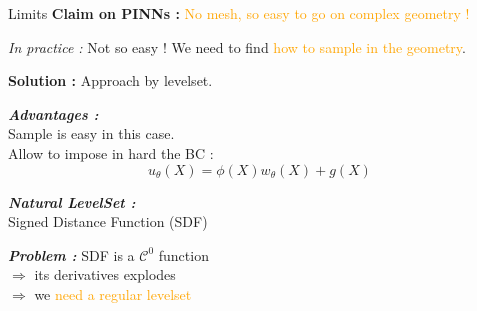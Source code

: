 \begin{frame}{Limits}
	\textbf{Claim on PINNs :} \textcolor{orange}{No mesh, so easy to go on complex geometry !}
	
	{\selectfont{}\relax} \textit{In practice :} Not so easy ! We need to find \textcolor{orange}{how to sample in the geometry}.
	
	\vspace{8pt}
	
	\textbf{Solution :} Approach by levelset.
	
	\begin{center}
	\end{center}
	
	\vspace{5pt}

	\begin{center}
		\begin{minipage}{0.44\linewidth}
			\textbf{\textit{Advantages :}} \\
			 Sample is easy in this case. \\
			 Allow to impose in hard the BC :
			\vspace{-5pt}
			\begin{equation*}
				u_\theta(X)=\phi(X)w_\theta(X)+g(X)
			\end{equation*}
		\end{minipage}
		\begin{minipage}{0.44\linewidth}
			\textbf{\textit{Natural LevelSet :}} \\
			Signed Distance Function (SDF)
			
			\vspace{5pt}
			\textbf{\textit{Problem :}} SDF is a $\mathcal{C}^0$ function  \\
			$\Rightarrow$ its derivatives explodes \\
			$\Rightarrow$ we \textcolor{orange}{need a regular levelset}
		\end{minipage}
	\end{center}
\end{frame}

